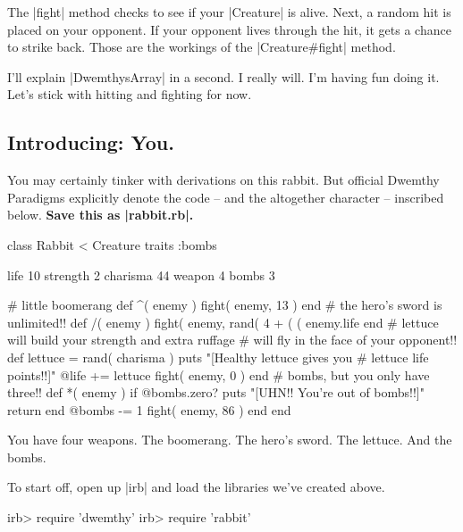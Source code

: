 \documentclass[12pt,twoside]{report}
\begin{document}
The \rubyinline|fight| method checks to see if your
\rubyinline|Creature| is alive.  Next, a random hit is
placed on your opponent.  If your opponent lives through the hit, it
gets a chance to strike back.  Those are the workings of the
\rubyinline|Creature#fight| method.

I'll explain \rubyinline|DwemthysArray| in a second.
I really will.  I'm having fun doing it. Let's stick with hitting and
fighting for now.



\subsection{Introducing: You.}



You may certainly tinker with derivations on this rabbit.  But
official Dwemthy Paradigms explicitly denote the code -- and the
altogether character -- inscribed below.  {\bf Save this as
  \rubyinline|rabbit.rb|.}


\begin{rubycode}

 class Rabbit < Creature
   traits :bombs

   life 10
   strength 2
   charisma 44
   weapon 4
   bombs 3

   # little boomerang
   def ^( enemy )
     fight( enemy, 13 )
   end
   # the hero's sword is unlimited!!
   def /( enemy )
     fight( enemy, rand( 4 + ( ( enemy.life %
   end
   # lettuce will build your strength and extra ruffage
   # will fly in the face of your opponent!!
   def %
     lettuce = rand( charisma )
     puts "[Healthy lettuce gives you #{ lettuce } life points!!]"
     @life += lettuce
     fight( enemy, 0 )
   end
   # bombs, but you only have three!!
   def *( enemy )
     if @bombs.zero?
       puts "[UHN!! You're out of bombs!!]"
       return
     end
     @bombs -= 1
     fight( enemy, 86 )
   end
 end

\end{rubycode}


You have four weapons.  The boomerang.  The hero's sword.  The
lettuce.  And the bombs.

To start off, open up \rubyinline|irb| and load the
libraries we've created above.


\begin{consolecode}

 irb> require 'dwemthy'
 irb> require 'rabbit'

\end{consolecode}
\end{document}
